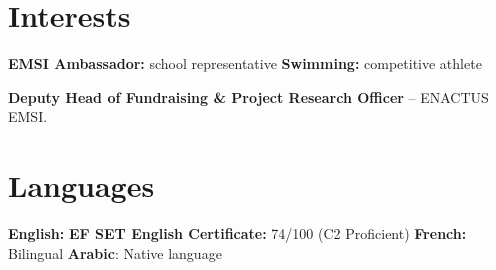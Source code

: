\documentclass[a4paper,10pt]{article}
\begin{document}
\vspace{1.5pt}
\section{Interests}

\textbf{EMSI Ambassador: }school representative \hfil \textbf{Swimming:} competitive athlete

\textbf{Deputy Head of Fundraising \& Project Research Officer }-- ENACTUS EMSI.


\vspace{1.5pt}
\section{Languages}
\textbf{English:}  \textbf{EF SET English Certificate:}
74/100 (C2 Proficient) \hfill
\textbf{French:} Bilingual \hfill
\textbf{Arabic}: Native language
\end{document}

